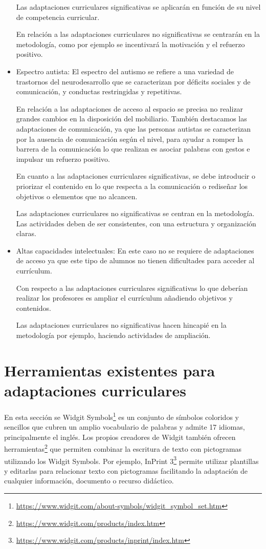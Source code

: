 \begin{itemize}
          Las adaptaciones curriculares significativas se aplicarán en función de su nivel de competencia curricular.

          En relación a las adaptaciones curriculares no significativas se centrarán en la metodología, como por ejemplo se incentivará la motivación y el refuerzo positivo.

    \item Espectro autista: El espectro del autismo se refiere a una variedad de trastornos del neurodesarrollo que se caracterizan por déficits sociales y de comunicación, y conductas restringidas y repetitivas.

          En relación a las adaptaciones de acceso al espacio se precisa no realizar grandes cambios en la disposición del mobiliario. También destacamos las adaptaciones de comunicación, ya que las personas autistas se caracterizan por la ausencia de comunicación según el nivel, para ayudar a romper la barrera de la comunicación lo que realizan es asociar palabras con gestos e impulsar un refuerzo positivo.

          En cuanto a las adaptaciones curriculares significativas, se debe introducir o priorizar el contenido en lo que respecta a la  comunicación o rediseñar los objetivos o elementos que no alcancen.

          Las adaptaciones curriculares no significativas se centran en la metodología. Las actividades deben de ser consistentes, con una estructura y organización claras.

    \item Altas capacidades intelectuales: En este caso no se requiere de adaptaciones de acceso ya que  este tipo de alumnos no tienen dificultades para acceder al currículum.

          Con respecto a las adaptaciones curriculares significativas lo que deberían realizar los profesores es ampliar el currículum añadiendo objetivos y contenidos.

          Las adaptaciones curriculares no significativas hacen hincapié en la metodología por ejemplo, haciendo actividades de ampliación.

\end{itemize}
\nocite{adaptacionUNED}


\section{Herramientas existentes para adaptaciones curriculares}\label{cap:herramientas}
En esta sección se 
Widgit Symbols\footnote{\url{https://www.widgit.com/about-symbols/widgit_symbol_set.htm}} es un conjunto de símbolos coloridos y sencillos que cubren un amplio vocabulario de palabras y admite 17 idiomas, principalmente el inglés. Los propios creadores de Widgit también ofrecen herramientas\footnote{\url{https://www.widgit.com/products/index.htm}} que permiten combinar la escritura de texto con pictogramas utilizando los Widgit Symbols. Por ejemplo, InPrint 3\footnote{\url{https://www.widgit.com/products/inprint/index.htm}} permite utilizar plantillas y editarlas para relacionar texto con pictogramas facilitando la adaptación de cualquier información, documento o recurso didáctico.

